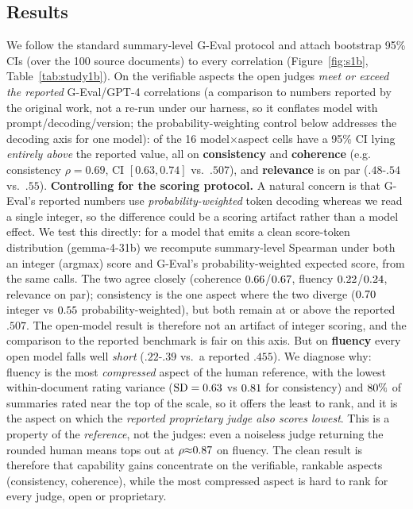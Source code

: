 \subsection{Results}
\begin{table}[t]\centering\small
\caption{Study 2. Summary-level Spearman $\rho$ of the most powerful open judges on SummEval vs.\ the reported
G-Eval-4/GPT-4 correlations (\ONEnjudg{} judgments). Green cells \emph{surpass} the reported per-aspect number.}
\label{tab:study1b}

\end{table}
We follow the standard summary-level G-Eval protocol \citep{liu2023geval} and attach bootstrap 95\% CIs (over the
100 source documents) to every correlation (Figure~\ref{fig:s1b}, Table~\ref{tab:study1b}). On the verifiable aspects the open judges \emph{meet or exceed the reported} G-Eval/GPT-4 correlations (a
comparison to numbers reported by the original work, not a re-run under our harness, so it conflates model with
prompt/decoding/version; the probability-weighting control below addresses the decoding axis for one model): \RTwobeats{} of the 16
model$\times$aspect cells have a 95\% CI lying \emph{entirely above} the reported value, all on \textbf{consistency}
and \textbf{coherence} (e.g.\ \ONEbest{} consistency $\rho{=}0.69$, CI $[0.63,0.74]$ vs.\ $.507$), and
\textbf{relevance} is on par ($.48$-$.54$ vs.\ $.55$). \textbf{Controlling for the scoring protocol.} A natural
concern is that G-Eval's reported numbers use \emph{probability-weighted} token decoding whereas we read a single
integer, so the difference could be a scoring artifact rather than a model effect. We test this directly: for a model
that emits a clean score-token distribution (gemma-4-31b) we recompute summary-level Spearman under both an integer
(argmax) score and G-Eval's probability-weighted expected score, from the same calls. The two agree closely
(coherence $0.66$/$0.67$, fluency $0.22$/$0.24$, relevance on par); consistency is the one
aspect where the two diverge ($0.70$ integer vs $0.55$ probability-weighted), but both remain at or above
the reported $.507$. The open-model result is therefore not an artifact of integer scoring, and the comparison to the
reported benchmark is fair on this axis. But on \textbf{fluency} every open model falls well
\emph{short} ($.22$-$.39$ vs.\ a reported $.455$). We diagnose why: fluency is the most \emph{compressed} aspect of
the human reference, with the lowest within-document rating variance ($\mathrm{SD}=0.63$ vs $0.81$ for
consistency) and $80\%$ of summaries rated near the top of the scale, so it offers the least to rank, and it
is the aspect on which the \emph{reported proprietary judge also scores lowest}. This is a property of the
\emph{reference}, not the judges: even a noiseless judge returning the rounded human means tops out at
$\rho{\approx}0.87$ on fluency. The clean result is therefore that capability gains concentrate on the
verifiable, rankable aspects (consistency, coherence), while the most compressed aspect is hard to rank for every
judge, open or proprietary.


